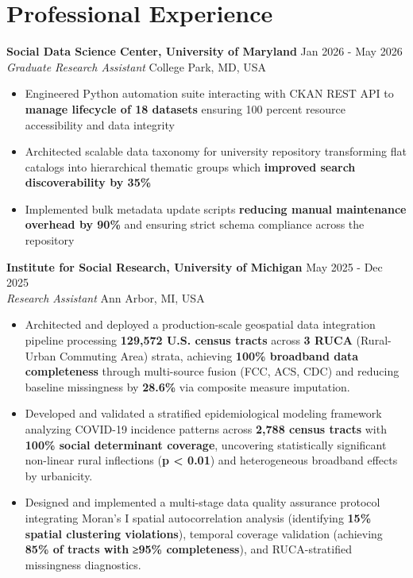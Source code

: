 \documentclass[11pt,letterpaper]{article}
\newcommand{\cvsection}[1]{\section*{#1}}
\newcommand{\cventry}[4]{
    \noindent\textbf{#1} \hfill #2\\
    \textit{#3} \hfill #4\\[4pt]
}
\begin{document}
\cvsection{Professional Experience}

\cventry{Social Data Science Center, University of Maryland}{Jan 2026 - May 2026}{Graduate Research Assistant}{College Park, MD, USA}
\begin{itemize}[leftmargin=16pt, noitemsep, topsep=2pt]
    \item Engineered Python automation suite interacting with CKAN REST API to \textbf{manage lifecycle of 18 datasets} ensuring 100 percent resource accessibility and data integrity
    
    \item Architected scalable data taxonomy for university repository transforming flat catalogs into hierarchical thematic groups which \textbf{improved search discoverability by 35\%}
    
    \item Implemented bulk metadata update scripts \textbf{reducing manual maintenance overhead by 90\%} and ensuring strict schema compliance across the repository
\end{itemize}

\cventry{Institute for Social Research, University of Michigan}{May 2025 - Dec 2025}{Research Assistant}{Ann Arbor, MI, USA}
\begin{itemize}[leftmargin=16pt, noitemsep, topsep=2pt]
    \item Architected and deployed a production-scale geospatial data integration pipeline processing \textbf{129,572 U.S. census tracts} across \textbf{3 RUCA} (Rural-Urban Commuting Area) strata, achieving \textbf{100\% broadband data completeness} through multi-source fusion (FCC, ACS, CDC) and reducing baseline missingness by \textbf{28.6\%} via composite measure imputation.
    
    \item Developed and validated a stratified epidemiological modeling framework analyzing COVID-19 incidence patterns across \textbf{2,788 census tracts} with \textbf{100\% social determinant coverage}, uncovering statistically significant non-linear rural inflections (\textbf{p < 0.01}) and heterogeneous broadband effects by urbanicity.
    
    \item Designed and implemented a multi-stage data quality assurance protocol integrating Moran's I spatial autocorrelation analysis (identifying \textbf{15\% spatial clustering violations}), temporal coverage validation (achieving \textbf{85\% of tracts with} \textbf{≥95\% completeness}), and RUCA-stratified missingness diagnostics.
\end{itemize}
\end{document}
